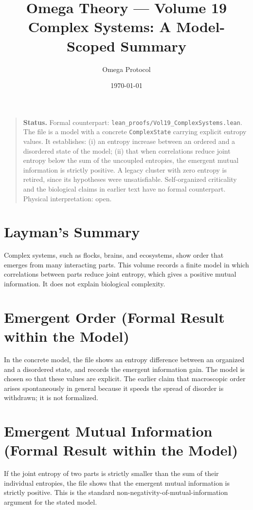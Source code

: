\documentclass[11pt, a4paper]{article}
\title{Omega Theory --- Volume 19\\\Large Complex Systems: A Model-Scoped Summary}
\author{Omega Protocol}
\date{\today}
\begin{document}
\maketitle

\begin{quote}
\textbf{Status.} Formal counterpart: \texttt{lean\_proofs/Vol19\_ComplexSystems.lean}. The file is a model with a concrete \texttt{ComplexState} carrying explicit entropy values. It establishes: (i) an entropy increase between an ordered and a disordered state of the model; (ii) that when correlations reduce joint entropy below the sum of the uncoupled entropies, the emergent mutual information is strictly positive. A legacy cluster with zero entropy is retired, since its hypotheses were unsatisfiable. Self-organized criticality and the biological claims in earlier text have no formal counterpart. Physical interpretation: open.
\end{quote}

\section*{Layman's Summary}
Complex systems, such as flocks, brains, and ecosystems, show order that emerges from many interacting parts. This volume records a finite model in which correlations between parts reduce joint entropy, which gives a positive mutual information. It does not explain biological complexity.

\section{Emergent Order (Formal Result within the Model)}
In the concrete model, the file shows an entropy difference between an organized and a disordered state, and records the emergent information gain. The model is chosen so that these values are explicit. The earlier claim that macroscopic order arises spontaneously in general because it speeds the spread of disorder is withdrawn; it is not formalized.

\section{Emergent Mutual Information (Formal Result within the Model)}
If the joint entropy of two parts is strictly smaller than the sum of their individual entropies, the file shows that the emergent mutual information is strictly positive. This is the standard non-negativity-of-mutual-information argument for the stated model.
\end{document}
